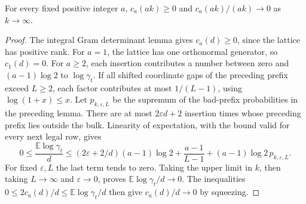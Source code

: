 \begin{theorem}
\label{thm:specht-sublinear-covolume}
\leanok
For every fixed positive integer $a$,
$c_a(ak)\geq0$ and $c_a(ak)/(ak)\to0$ as $k\to\infty$.
\end{theorem}
\begin{proof}
The integral Gram determinant lemma gives $c_a(d)\geq0$, since the
lattice has positive rank.
For $a=1$, the lattice has one orthonormal generator, so $c_1(d)=0$.
For $a\geq2$, each insertion contributes a number between zero and
$(a-1)\log2$ to $\log\gamma_t$. If all shifted coordinate gaps of
the preceding prefix exceed $L\geq2$, each factor contributes at
most $1/(L-1)$, using $\log(1+x)\leq x$. Let $p_{k,\varepsilon,L}$
be the supremum of the bad-prefix probabilities in the preceding
lemma. There are at most $2\varepsilon d+2$ insertion times whose
preceding prefix lies outside the bulk. Linearity of expectation,
with the bound valid for every next legal row, gives
\[
 0\leq\frac{\mathbb E\log\gamma_t}{d}
 \leq(2\varepsilon+2/d)(a-1)\log2
    +\frac{a-1}{L-1}+(a-1)\log2\,p_{k,\varepsilon,L}.
\]
For fixed $\varepsilon,L$ the last term tends to zero. Taking the
upper limit in $k$, then taking $L\to\infty$ and
$\varepsilon\to0$, proves $\mathbb E\log\gamma_t/d\to0$.
The inequalities $0\leq2c_a(d)/d\leq\mathbb E\log\gamma_t/d$
then give $c_a(d)/d\to0$ by squeezing.
\end{proof}

